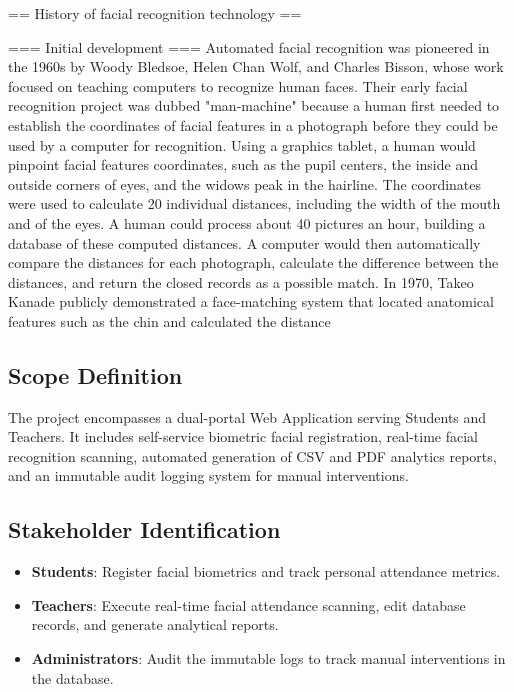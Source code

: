 \documentclass[12pt,a4paper]{report}
\begin{document}
== History of facial recognition technology ==


=== Initial development ===
Automated facial recognition was pioneered in the 1960s by Woody Bledsoe, Helen Chan Wolf, and Charles Bisson, whose work focused on teaching computers to recognize human faces. Their early facial recognition project was dubbed "man-machine" because a human first needed to establish the coordinates of facial features in a photograph before they could be used by a computer for recognition. Using a graphics tablet, a human would pinpoint facial features coordinates, such as the pupil centers, the inside and outside corners of eyes, and the widows peak in the hairline. The coordinates were used to calculate 20 individual distances, including the width of the mouth and of the eyes. A human could process about 40 pictures an hour, building a database of these computed distances. A computer would then automatically compare the distances for each photograph, calculate the difference between the distances, and return the closed records as a possible match.
In 1970, Takeo Kanade publicly demonstrated a face-matching system that located anatomical features such as the chin and calculated the distance 



\subsection{Scope Definition}
The project encompasses a dual-portal Web Application serving Students and Teachers. It includes self-service biometric facial registration, real-time facial recognition scanning, automated generation of CSV and PDF analytics reports, and an immutable audit logging system for manual interventions.

\subsection{Stakeholder Identification}
\begin{itemize}
    \item \textbf{Students}: Register facial biometrics and track personal attendance metrics.
    \item \textbf{Teachers}: Execute real-time facial attendance scanning, edit database records, and generate analytical reports.
    \item \textbf{Administrators}: Audit the immutable logs to track manual interventions in the database.
\end{itemize}
\end{document}
